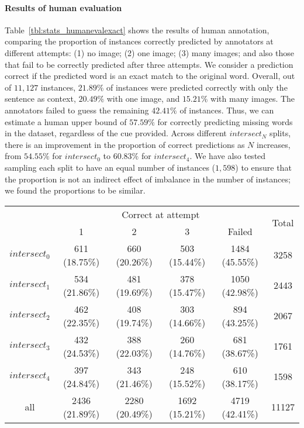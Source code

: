 \documentclass[twocolumn]{svjour3}          \smartqed  \usepackage{graphicx}
\begin{document}
\paragraph{Results of human evaluation}

Table~\ref{tbl:stats_humanevalexact} shows the results of human annotation, comparing the proportion of instances correctly predicted by annotators at different attempts: (1) no image; (2) one image; (3) many images; and also those that fail to be correctly predicted after three attempts. We consider a prediction correct if the predicted word is an exact match to the original word. Overall, out of $11,127$ instances, $21.89\%$ of instances were predicted correctly with only the sentence as context, $20.49\%$ with one image, and $15.21\%$ with many images. The annotators failed to guess the remaining $42.41\%$ of instances. Thus, we can estimate a human upper bound of $57.59\%$ for correctly predicting missing words in the dataset, regardless of the cue provided. Across different $intersect_N$ splits, there is an improvement in the proportion of correct predictions as $N$ increases, from $54.55\%$ for $intersect_0$ to $60.83\%$ for $intersect_4$. We have also tested sampling each split to have an equal number of instances ($1,598$) to ensure that the proportion is not an indirect effect of imbalance in the number of instances; we found the proportions to be similar.

\begin{table*}[t]
    \caption{Distribution across different attempts by humans in the fill-in-the-blank task.}
    \label{tbl:stats_humanevalexact}
    \centering
    \small
    \begin{tabular}{cccccc}
    \toprule
    & \multicolumn{4}{c}{Correct at attempt} &
    \multirow{2}{*}{Total} \\
    \noalign{\smallskip}    
    \cline{2-5}
    \noalign{\smallskip}
    & 1 & 2 & 3 & Failed & \\
    \midrule
    $intersect_0$ & 611 (18.75\%) & 660 (20.26\%) & 503 (15.44\%) & 1484 (45.55\%) & 3258\\
    $intersect_1$ & 534 (21.86\%) & 481 (19.69\%) & 378 (15.47\%) & 1050 (42.98\%) & 2443\\
    $intersect_2$ & 462 (22.35\%) & 408 (19.74\%) & 303 (14.66\%) & 894 (43.25\%) & 2067\\
    $intersect_3$ & 432 (24.53\%) & 388 (22.03\%) & 260 (14.76\%) & 681 (38.67\%) & 1761\\
    $intersect_4$ & 397 (24.84\%) & 343 (21.46\%) & 248 (15.52\%) & 610 (38.17\%) & 1598\\
    \midrule
    all & 2436 (21.89\%) & 2280 (20.49\%) & 1692 (15.21\%) & 4719 (42.41\%) & 11127\\
    \bottomrule
    \end{tabular}
\end{table*}
\end{document}

